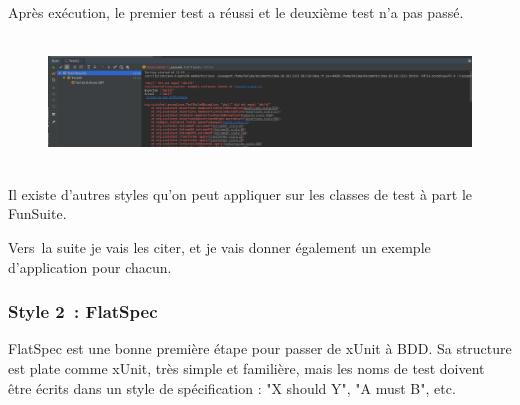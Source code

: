 \documentclass[12pt]{article}
\begin{document}
\begin{justify}
Après exécution, le premier test a réussi et le deuxième test n’a pas passé.
\end{justify}\par




\begin{figure}[H]
	\begin{Center}
		\includegraphics[width=6.3in,height=1.35in]{./media/image25.png}
	\end{Center}
\end{figure}



\par

\begin{justify}
Il existe d’autres styles qu’on peut appliquer sur les classes de test à part le FunSuite.
\end{justify}\par

\begin{justify}
Vers\ la suite je vais les citer, et je vais donner également un exemple d’application pour chacun.  
\end{justify}\par

\subsubsection{Style 2 : FlatSpec}

\begin{justify}
FlatSpec est une bonne première étape pour passer de xUnit à BDD. Sa structure est plate comme xUnit, très simple et familière, mais les noms de test doivent être écrits dans un style de spécification : "X should Y", "A must B", etc.
\end{justify}\par
\end{document}
